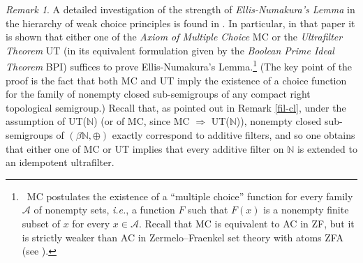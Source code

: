 \documentclass{amsart}
\theoremstyle{definition}
\theoremstyle{remark}
\newtheorem{remark}[theorem]{Remark}
\def\N{\mathbb{N}}
\begin{document}
\begin{remark}
A detailed investigation of the strength of 
\emph{Ellis-Numakura's Lemma} in the hierarchy of weak choice 
principles is found in \cite{ta}.
In particular, in that paper it is shown that
either one of the \emph{Axiom of Multiple Choice} \textsf{MC}
or the \emph{Ultrafilter Theorem} \textsf{UT} (in its equivalent
formulation given by the \emph{Boolean Prime Ideal Theorem} \textsf{BPI})
suffices to prove Ellis-Numakura's Lemma.\footnote
{~\textsf{MC} postulates the existence of a 
``multiple choice'' function for 
every family $\mathcal{A}$ of nonempty sets,
\emph{i.e.}, a function $F$ such that
$F(x)$ is a nonempty finite subset of $x$ for every $x\in\mathcal{A}$.
Recall that \textsf{MC} is equivalent to \textsf{AC}
in \textsf{ZF}, but it is strictly weaker than \textsf{AC} in 
Zermelo--Fraenkel set theory with atoms \textsf{ZFA} (see \cite{hr}).}
(The key point of the proof is the fact that both
\textsf{MC} and \textsf{UT} imply the
existence of a choice function for the family of 
nonempty closed sub-semigroups
of any compact right topological semigroup.)
Recall that, as pointed out in Remark \ref{fil-cl}, 
under the assumption of \textsf{UT}($\N$) (or of \textsf{MC}, since \textsf{MC} $\Rightarrow$ \textsf{UT}($\N$)),
nonempty closed sub-semigroups of $(\beta\N,\oplus)$ exactly
correspond to additive filters, and so one obtains that
either one of \textsf{MC} or \textsf{UT} implies that
every additive filter on $\N$ is extended to an idempotent ultrafilter.
\end{remark}
\end{document}
